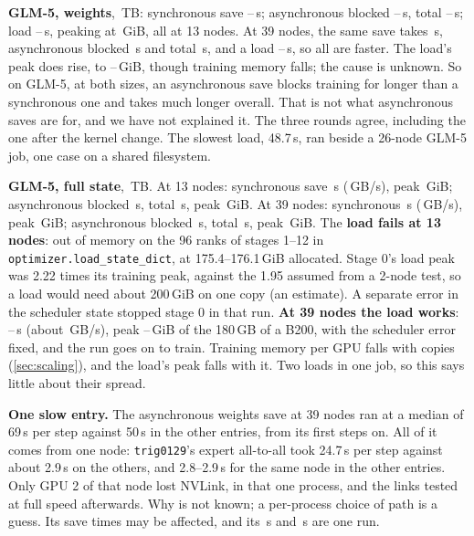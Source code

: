 \textbf{GLM-5, weights}, \TriCkGWSize\,TB: synchronous save \TriCkGWSyncLo--\TriCkGWSyncHi\,s; asynchronous blocked \TriCkGWAsyncBlockedLo--\TriCkGWAsyncBlockedHi\,s, total \TriCkGWAsyncTotalLo--\TriCkGWAsyncTotalHi\,s; load \TriCkGWLoadLo--\TriCkGWLoadHi\,s, peaking at \TriCkGWLoadPeak\,GiB, all at 13 nodes. At 39 nodes, the same save takes \TriCkGBigWSync\,s, asynchronous blocked \TriCkGBigWBlocked\,s and total \TriCkGBigWTotal\,s, and a load \TriCkGBigWLoadLo--\TriCkGBigWLoadHi\,s, so all are faster. The load's peak does rise, to \TriCkGBigWLoadPeakLo--\TriCkGBigWLoadPeakHi\,GiB, though training memory falls; the cause is unknown. So on GLM-5, at both sizes, an asynchronous save blocks training for longer than a synchronous one and takes much longer overall. That is not what asynchronous saves are for, and we have not explained it. The three rounds agree, including the one after the kernel change. The slowest load, 48.7\,s, ran beside a 26-node GLM-5 job, one case on a shared filesystem.

\textbf{GLM-5, full state}, \TriCkGFSize\,TB. At 13 nodes: synchronous save \TriCkGFSync\,s (\TriCkGFSyncGBs\,GB/s), peak \TriCkGFSyncPeak\,GiB; asynchronous blocked \TriCkGFBlocked\,s, total \TriCkGFTotal\,s, peak \TriCkGFAsyncPeak\,GiB. At 39 nodes: synchronous \TriCkGBigFSync\,s (\TriCkGBigFSyncGBs\,GB/s), peak \TriCkGBigFSyncPeak\,GiB; asynchronous blocked \TriCkGBigFBlocked\,s, total \TriCkGBigFTotal\,s, peak \TriCkGBigFAsyncPeak\,GiB. The \textbf{load fails at 13 nodes}: out of memory on the 96 ranks of stages 1--12 in \texttt{optimizer.load\_state\_dict}, at 175.4--176.1\,GiB allocated. Stage 0's load peak was 2.22 times its training peak, against the 1.95 assumed from a 2-node test, so a load would need about 200\,GiB on one copy (an estimate). A separate error in the scheduler state stopped stage 0 in that run. \textbf{At 39 nodes the load works}: \TriCkGBigFLoadLo--\TriCkGBigFLoadHi\,s (about \TriCkGBigFLoadGBsLo\,GB/s), peak \TriCkGBigFLoadPeakLo--\TriCkGBigFLoadPeakHi\,GiB of the 180\,GB of a B200, with the scheduler error fixed, and the run goes on to train. Training memory per GPU falls with copies (\cref{sec:scaling}), and the load's peak falls with it. Two loads in one job, so this says little about their spread.

\textbf{One slow entry.} The asynchronous weights save at 39 nodes ran at a median of 69\,s per step against 50\,s in the other entries, from its first steps on. All of it comes from one node: \texttt{trig0129}'s expert all-to-all took 24.7\,s per step against about 2.9\,s on the others, and 2.8--2.9\,s for the same node in the other entries. Only GPU 2 of that node lost NVLink, in that one process, and the links tested at full speed afterwards. Why is not known; a per-process choice of path is a guess. Its save times may be affected, and its \TriCkGBigWBlocked\,s and \TriCkGBigWTotal\,s are one run.

